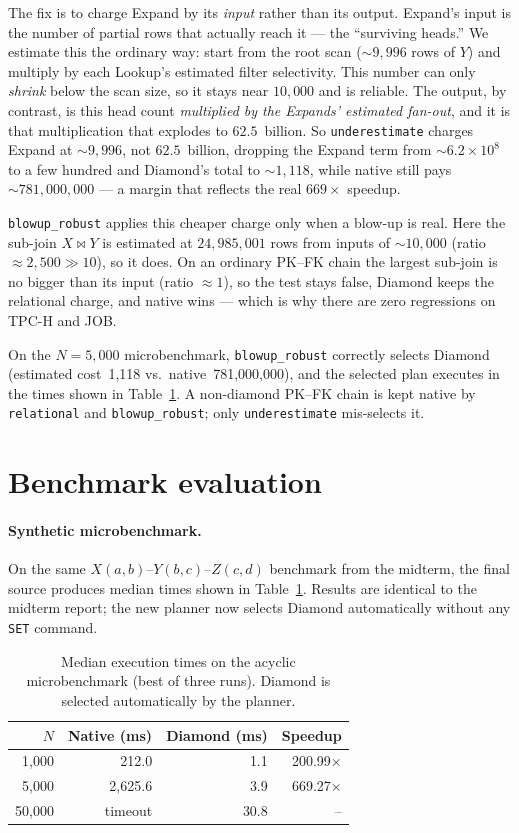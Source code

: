 \documentclass[10pt,twocolumn]{article}
\newcommand{\code}[1]{{\small\texttt{#1}}}
\begin{document}
The fix is to charge Expand by its \emph{input} rather than its output. Expand's
input is the number of partial rows that actually reach it --- the
``surviving heads.'' We estimate this the ordinary way: start from the root scan
(${\sim}9{,}996$ rows of $Y$) and multiply by each Lookup's estimated filter
selectivity. This number can only \emph{shrink} below the scan size, so it stays
near $10{,}000$ and is reliable. The output, by contrast, is this head count
\emph{multiplied by the Expands' estimated fan-out}, and it is that
multiplication that explodes to $62.5$~billion. So \code{underestimate} charges
Expand at ${\sim}9{,}996$, not $62.5$~billion, dropping the Expand term from
${\sim}6.2\times10^{8}$ to a few hundred and Diamond's total to ${\sim}1{,}118$,
while native still pays ${\sim}781{,}000{,}000$ --- a margin that reflects the
real $669\times$ speedup.

\code{blowup\_robust} applies this cheaper charge only when a blow-up is real.
Here the sub-join $X\bowtie Y$ is estimated at $24{,}985{,}001$ rows from inputs
of ${\sim}10{,}000$ (ratio ${\approx}2{,}500\gg 10$), so it does. On an ordinary
PK--FK chain the largest sub-join is no bigger than its input (ratio
${\approx}1$), so the test stays false, Diamond keeps the relational charge, and
native wins --- which is why there are zero regressions on TPC-H and JOB.

On the $N=5{,}000$ microbenchmark, \code{blowup\_robust} correctly selects
Diamond (estimated cost~1,118 vs.\ native~781,000,000), and the selected plan
executes in the times shown in Table~\ref{tab:results}. A non-diamond PK--FK
chain is kept native by
\code{relational} and \code{blowup\_robust}; only \code{underestimate}
mis-selects it.

\section{Benchmark evaluation}

\paragraph{Synthetic microbenchmark.}
On the same $X(a,b)$--$Y(b,c)$--$Z(c,d)$ benchmark from the midterm, the
final source produces median times shown in Table~\ref{tab:results}. Results
are identical to the midterm report; the new planner now selects Diamond
automatically without any \code{SET} command.

\begin{table}[ht]
\centering\small
\setlength{\tabcolsep}{4pt}
\begin{tabular}{rrrr}\toprule
$N$ & Native (ms) & Diamond (ms) & Speedup\\\midrule
1,000 & 212.0 & 1.1 & 200.99$\times$\\
5,000 & 2,625.6 & 3.9 & 669.27$\times$\\
50,000 & timeout & 30.8 & --\\\bottomrule
\end{tabular}
\caption{Median execution times on the acyclic microbenchmark (best of three
runs). Diamond is selected automatically by the planner.}
\label{tab:results}
\end{table}
\end{document}
